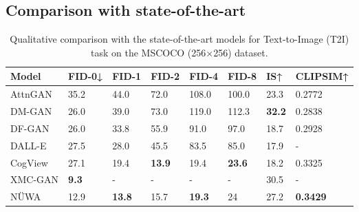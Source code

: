 \documentclass[10pt,twocolumn,letterpaper]{article}
\begin{document}
\subsection{Comparison with state-of-the-art} \label{sec:cmp}
\vspace{-4mm}
\newcommand{\bwidth}{0.7cm}
\begin{table}[t]
\footnotesize
\caption{Qualitative comparison with the state-of-the-art models for Text-to-Image (T2I) task on the MSCOCO (256×256) dataset.}
\label{tab:t2i}
\tabcolsep=0.06cm
\begin{tabular}{p{1.9cm}p{0.9cm}p{\bwidth}p{\bwidth}p{\bwidth}p{0.7cm}p{\bwidth}p{1.1cm}}
\toprule
Model              & FID-0↓      & FID-1       & FID-2         & FID-4         & FID-8         & IS↑           & CLIPSIM↑ \\
\midrule
AttnGAN\cite{xuAttnganFinegrainedText2018}     & 35.2        & 44.0          & 72.0            & 108.0           & 100.0           & 23.3          & 0.2772        \\
DM-GAN\cite{zhuDmganDynamicMemory2019}     & 26.0          & 39.0          & 73.0            & 119.0           & 112.3         & \textbf{32.2} & 0.2838        \\
DF-GAN\cite{taoDfganDeepFusion2020}     & 26.0          & 33.8        & 55.9          & 91.0            & 97.0            & 18.7          & 0.2928        \\
  DALL-E\cite{rameshZeroShotTexttoImageGeneration2021}  & 27.5        & 28.0          & 45.5          & 83.5          & 85.0            & 17.9          & -        \\
CogView\cite{dingCogViewMasteringTexttoImage2021} & 27.1        & 19.4        & \textbf{13.9} & 19.4 & \textbf{23.6} & 18.2          & 0.3325        \\
XMC-GAN\cite{zhangCrossmodalContrastiveLearning2021} & \textbf{9.3}        & -        & - & -& - & 30.5          & -        \\

\midrule
NÜWA               & 12.9 & \textbf{13.8} & 15.7          & \textbf{19.3} & 24          & 27.2          & \textbf{0.3429}   \\
\bottomrule
\end{tabular}
\label{tab:metric}
\vspace{-3mm}
\end{table}
\end{document}
